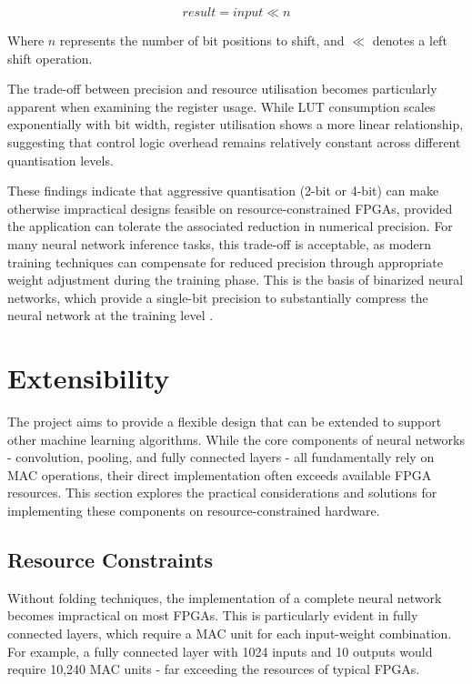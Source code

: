 \begin{equation}
    result = input \ll n
\end{equation}

Where $n$ represents the number of bit positions to shift, and $\ll$ denotes a left shift operation.

The trade-off between precision and resource utilisation becomes particularly apparent when examining the register usage. While LUT consumption scales exponentially with bit width, register utilisation shows a more linear relationship, suggesting that control logic overhead remains relatively constant across different quantisation levels.

These findings indicate that aggressive quantisation (2-bit or 4-bit) can make otherwise impractical designs feasible on resource-constrained FPGAs, provided the application can tolerate the associated reduction in numerical precision. For many neural network inference tasks, this trade-off is acceptable, as modern training techniques can compensate for reduced precision through appropriate weight adjustment during the training phase.
This is the basis of binarized neural networks, which provide a single-bit precision to substantially compress the neural network at the training level \cite{18}.

\section{Extensibility}
The project aims to provide a flexible design that can be extended to support other machine learning algorithms. While the core components of neural networks - convolution, pooling, and fully connected layers - all fundamentally rely on MAC operations, their direct implementation often exceeds available FPGA resources. This section explores the practical considerations and solutions for implementing these components on resource-constrained hardware.

\subsection{Resource Constraints}
Without folding techniques, the implementation of a complete neural network becomes impractical on most FPGAs. This is particularly evident in fully connected layers, which require a MAC unit for each input-weight combination. For example, a fully connected layer with 1024 inputs and 10 outputs would require 10,240 MAC units - far exceeding the resources of typical FPGAs.

